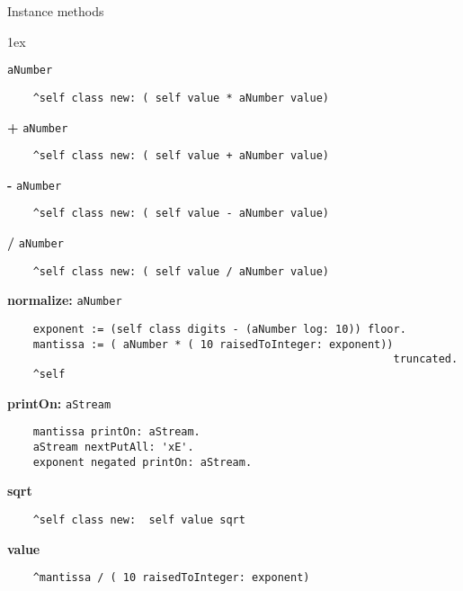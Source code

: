 Instance methods
{\parskip 1ex\par\noindent}
{\bf *} {\tt aNumber}
\begin{verbatim}
    ^self class new: ( self value * aNumber value)

\end{verbatim}
{\bf +} {\tt aNumber}
\begin{verbatim}
    ^self class new: ( self value + aNumber value)

\end{verbatim}
{\bf -} {\tt aNumber}
\begin{verbatim}
    ^self class new: ( self value - aNumber value)

\end{verbatim}
{\bf /} {\tt aNumber}
\begin{verbatim}
    ^self class new: ( self value / aNumber value)

\end{verbatim}
{\bf normalize:} {\tt aNumber}
\begin{verbatim}
    exponent := (self class digits - (aNumber log: 10)) floor.
    mantissa := ( aNumber * ( 10 raisedToInteger: exponent)) 
                                                            truncated.
    ^self

\end{verbatim}
{\bf printOn:} {\tt aStream}
\begin{verbatim}
    mantissa printOn: aStream.
    aStream nextPutAll: 'xE'.
    exponent negated printOn: aStream.

\end{verbatim}
{\bf sqrt}
\begin{verbatim}
    ^self class new:  self value sqrt

\end{verbatim}
{\bf value}
\begin{verbatim}
    ^mantissa / ( 10 raisedToInteger: exponent)

\end{verbatim}

